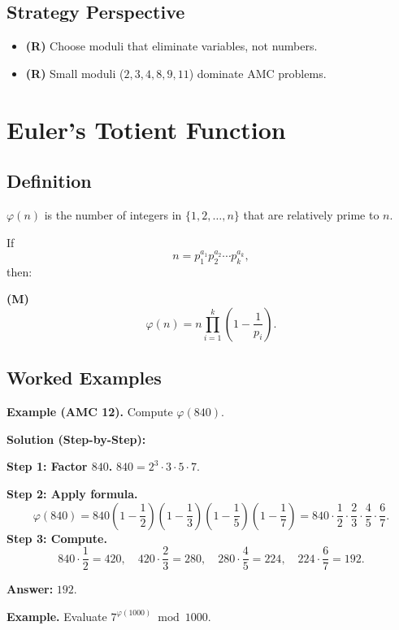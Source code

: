 \documentclass[12pt]{extarticle}
\begin{document}
\subsection*{Strategy Perspective}
\begin{itemize}
\item \textbf{(R)} Choose moduli that eliminate variables, not numbers.
\item \textbf{(R)} Small moduli ($2,3,4,8,9,11$) dominate AMC problems.
\end{itemize}

\section{Euler’s Totient Function}

\subsection*{Definition}
$\varphi(n)$ is the number of integers in $\{1,2,\dots,n\}$ that are relatively prime to $n$.

If
\[
n=p_1^{a_1}p_2^{a_2}\cdots p_k^{a_k},
\]
then:

\textbf{(M)}
\[
\varphi(n)=n\prod_{i=1}^k\left(1-\frac1{p_i}\right).
\]

\subsection*{Worked Examples}

\begin{examplebox}
	\textbf{Example (AMC 12).} Compute $\varphi(840)$.
\end{examplebox}

	\textbf{Solution (Step-by-Step):}

	\textbf{Step 1: Factor $840$.} $840 = 2^3 \cdot 3 \cdot 5 \cdot 7$.

	\textbf{Step 2: Apply formula.}
\[
\varphi(840) = 840\left(1-\frac12\right)\left(1-\frac13\right)\left(1-\frac15\right)\left(1-\frac17\right) = 840 \cdot \frac12 \cdot \frac23 \cdot \frac45 \cdot \frac67.
\]
	\textbf{Step 3: Compute.}
\[
840 \cdot \frac12 = 420,\quad 420 \cdot \frac23 = 280,\quad 280 \cdot \frac45 = 224,\quad 224 \cdot \frac67 = 192.
\]

	\textbf{Answer:} $\boxed{192}$.

\begin{examplebox}
\textbf{Example.} Evaluate $7^{\varphi(1000)} \bmod 1000$.
\end{examplebox}
\end{document}
